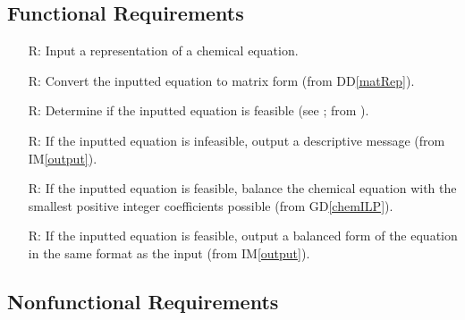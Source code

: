 \documentclass[12pt]{article}
\newcommand{\gdref}[1]{GD\ref{#1}}
\newcommand{\ddref}[1]{DD\ref{#1}}
\newcommand{\iref}[1]{IM\ref{#1}}
\newcounter{reqnum} %
\begin{document}
\subsection{Functional Requirements} \label{sec_funcReqs}

\begin{itemize}

  \item[R\refstepcounter{reqnum}\thereqnum \label{R_input}:] Input a
    representation of a chemical equation.

  \item[R\refstepcounter{reqnum}\thereqnum \label{R_convert}:] Convert the
    inputted equation to matrix form (from \ddref{matRep}).

  \item[R\refstepcounter{reqnum}\thereqnum \label{R_feasible}:] Determine if the
    inputted equation is feasible (see ;	from
    ).

  \item[R\refstepcounter{reqnum}\thereqnum \label{R_infeasOutput}:] If the
    inputted equation is infeasible, output a descriptive message (from
    \iref{output}).

  \item[R\refstepcounter{reqnum}\thereqnum \label{R_balance}:] If the
    inputted equation is feasible, balance the chemical equation with the smallest
    positive integer coefficients possible (from \gdref{chemILP}).

  \item[R\refstepcounter{reqnum}\thereqnum \label{R_feasOutput}:] If the
    inputted equation is feasible, output a balanced form of the equation in the
    same format as the input (from \iref{output}).

\end{itemize}


\subsection{Nonfunctional Requirements} \label{sec_nonfuncReqs}
\end{document}
